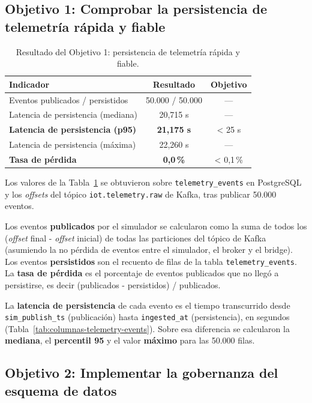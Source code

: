\subsection{Objetivo 1: Comprobar la persistencia de telemetría rápida y fiable}

\begin{table}[H]
  \centering
  \begin{tabular}{|p{6cm}|c|c|}
    \hline
    \textbf{Indicador} & \textbf{Resultado} & \textbf{Objetivo} \\ \hline
    Eventos publicados / persistidos & 50.000 / 50.000 & — \\ \hline
    Latencia de persistencia (mediana) & 20,715 s & — \\ \hline
    \textbf{Latencia de persistencia (p95)} & \textbf{21,175 s} & < 25 s \\ \hline
    Latencia de persistencia (máxima) & 22,260 s & — \\ \hline
    \textbf{Tasa de pérdida} & \textbf{0,0\,\%} & < 0,1\,\% \\ \hline
  \end{tabular}
  \caption{Resultado del Objetivo 1: persistencia de telemetría rápida y fiable.}
  \label{tab:resultado-obj1}
\end{table}

Los valores de la Tabla~\ref{tab:resultado-obj1} se obtuvieron sobre \texttt{telemetry\_events} en PostgreSQL y los \textit{offsets} del tópico \texttt{iot.telemetry.raw} de Kafka, tras publicar 50.000 eventos.

Los eventos \textbf{publicados} por el simulador se calcularon como la suma de todos los (\textit{offset} final - \textit{offset} inicial) de todas las particiones del tópico de Kafka (asumiendo la no pérdida de eventos entre el simulador, el broker y el bridge). Los eventos \textbf{persistidos} son el recuento de filas de la tabla \texttt{telemetry\_events}. La \textbf{tasa de pérdida} es el porcentaje de eventos publicados que no llegó a persistirse, es decir (publicados - persistidos) / publicados.

La \textbf{latencia de persistencia} de cada evento es el tiempo transcurrido desde \texttt{sim\_publish\_ts} (publicación) hasta \texttt{ingested\_at} (persistencia), en segundos (Tabla~\ref{tab:columnas-telemetry-events}). Sobre esa diferencia se calcularon la \textbf{mediana}, el \textbf{percentil 95} y el valor \textbf{máximo} para las 50.000 filas.

\subsection{Objetivo 2: Implementar la gobernanza del esquema de datos}

